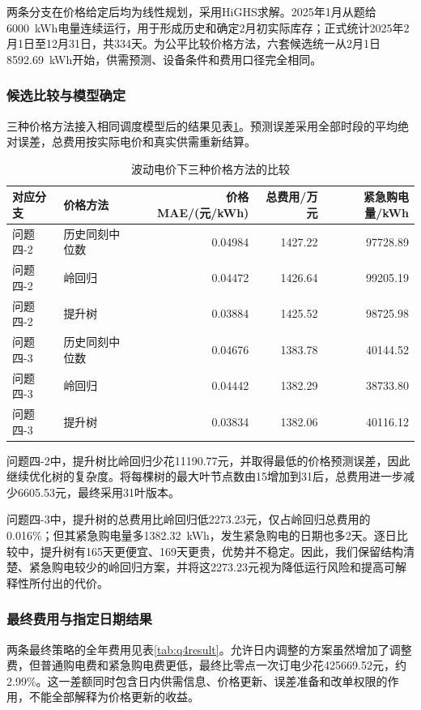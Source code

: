 \documentclass[11pt,a4paper]{article}
\begin{document}
两条分支在价格给定后均为线性规划，采用HiGHS求解。2025年1月从题给6000~kWh电量连续运行，用于形成历史和确定2月初实际库存；正式统计2025年2月1日至12月31日，共334天。为公平比较价格方法，六套候选统一从2月1日8592.69~kWh开始，供需预测、设备条件和费用口径完全相同。

\subsubsection{候选比较与模型确定}

三种价格方法接入相同调度模型后的结果见表\ref{tab:q4compare}。预测误差采用全部时段的平均绝对误差，总费用按实际电价和真实供需重新结算。

\begin{table}[htbp]
\centering\small
\caption{波动电价下三种价格方法的比较}
\label{tab:q4compare}
\begin{tabular}{llrrr}
\toprule
对应分支 & 价格方法 & 价格MAE/(元/kWh) & 总费用/万元 & 紧急购电量/kWh \\
\midrule
问题四-2 & 历史同刻中位数 & 0.04984 & 1427.22 & 97728.89 \\
问题四-2 & 岭回归 & 0.04472 & 1426.64 & 99205.19 \\
问题四-2 & 提升树 & 0.03884 & 1425.52 & 98725.98 \\
问题四-3 & 历史同刻中位数 & 0.04676 & 1383.78 & 40144.52 \\
问题四-3 & 岭回归 & 0.04442 & 1382.29 & 38733.80 \\
问题四-3 & 提升树 & 0.03834 & 1382.06 & 40116.12 \\
\bottomrule
\end{tabular}
\end{table}

问题四-2中，提升树比岭回归少花11190.77元，并取得最低的价格预测误差，因此继续优化树的复杂度。将每棵树的最大叶节点数由15增加到31后，总费用进一步减少6605.53元，最终采用31叶版本。

问题四-3中，提升树的总费用比岭回归低2273.23元，仅占岭回归总费用的0.016\%；但其紧急购电量多1382.32~kWh，发生紧急购电的日期也多2天。逐日比较中，提升树有165天更便宜、169天更贵，优势并不稳定。因此，我们保留结构清楚、紧急购电较少的岭回归方案，并将这2273.23元视为降低运行风险和提高可解释性所付出的代价。

\subsubsection{最终费用与指定日期结果}

两条最终策略的全年费用见表\ref{tab:q4result}。允许日内调整的方案虽然增加了调整费，但普通购电费和紧急购电费更低，最终比零点一次订电少花425669.52元，约2.99\%。这一差额同时包含日内供需信息、价格更新、误差准备和改单权限的作用，不能全部解释为价格更新的收益。
\end{document}
